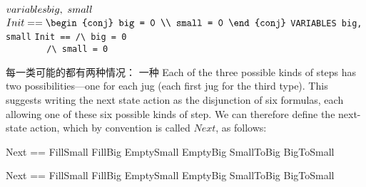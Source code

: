 \begin{ch}
\begin{display}
\begin{twocols}%
$\VARIABLES big,\ small$ 
$Init == 
\begin{conj}
big = 0 \\ small = 0
\end{conj}
$
\midcol
\verb*|VARIABLES big, small|
\verb*|Init == /\ big = 0| \\
\verb*|        /\ small = 0|
\end{twocols}
\end{display}
\smallskip
每一类可能的\tlastep{}都有两种情况：
一种
Each of the three possible kinds of steps has two possibilities---one
for each jug (each first jug for the third type).  This suggests
writing the next state action as the disjunction of six formulas, each
allowing one of these six possible kinds of step.  We can therefore
define the next-state action, which by convention is called $Next$, as
follows:
\medskip
\begin{twocols}%
\begin{notla}
Next == \/ FillSmall 
        \/ FillBig    
        \/ EmptySmall 
        \/ EmptyBig    
        \/ SmallToBig    
        \/ BigToSmall 
\end{notla}
\begin{tlatex}
%
%
%
%
%
%
\end{tlatex}
\midcol
\begin{verbatim*}
Next == \/ FillSmall 
        \/ FillBig    
        \/ EmptySmall 
        \/ EmptyBig    
        \/ SmallToBig    
        \/ BigToSmall 
\end{verbatim*}
\end{twocols}
\medskip
\end{ch}

